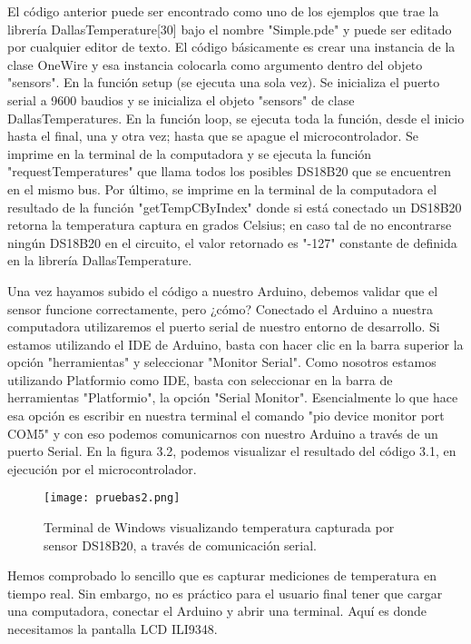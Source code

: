 \par \noindent
El código anterior puede ser encontrado como uno de los ejemplos que trae la librería DallasTemperature[30] bajo el nombre "Simple.pde" y puede ser editado por cualquier editor de texto. El código básicamente es crear una instancia de la clase OneWire y esa instancia colocarla como argumento dentro del objeto "sensors". En la función setup (se ejecuta una sola vez). Se inicializa el puerto serial a 9600 baudios y se inicializa el objeto "sensors" de clase DallasTemperatures. En la función loop, se ejecuta toda la función, desde el inicio hasta el final, una y otra vez; hasta que se apague el microcontrolador. Se imprime en la terminal de la computadora y se ejecuta la función "requestTemperatures" que llama todos los posibles DS18B20 que se encuentren en el mismo bus. Por último, se imprime en la terminal de la computadora el resultado de la función "getTempCByIndex" donde si está conectado un DS18B20 retorna la temperatura captura en grados Celsius; en caso tal de no encontrarse ningún DS18B20 en el circuito, el valor retornado es "-127" constante de definida en la librería DallasTemperature.

\par \noindent
Una vez hayamos subido el código a nuestro Arduino, debemos validar que el sensor funcione correctamente, pero ¿cómo? Conectado el Arduino a nuestra computadora utilizaremos el puerto serial de nuestro entorno de desarrollo. Si estamos utilizando el IDE de Arduino, basta con hacer clic en la barra superior la opción "herramientas" y seleccionar "Monitor Serial". Como nosotros estamos utilizando Platformio como IDE, basta con seleccionar en la barra de herramientas "Platformio", la opción "Serial Monitor". Esencialmente lo que hace esa opción es escribir en nuestra terminal el comando "pio device monitor port COM5" y con eso podemos comunicarnos con nuestro Arduino a través de un puerto Serial. En la figura 3.2, podemos visualizar el resultado del código 3.1, en ejecución por el microcontrolador.

\begin{figure}[H]
	\centering
	\texttt{[image: pruebas2.png]}
	\caption{Terminal de Windows visualizando temperatura capturada por sensor DS18B20, a través de comunicación serial.}
\end{figure}

\par \noindent
Hemos comprobado lo sencillo que es capturar mediciones de temperatura en tiempo real. Sin embargo, no es práctico para el usuario final tener que cargar una computadora, conectar el Arduino y abrir una terminal. Aquí es donde necesitamos la pantalla LCD ILI9348.

